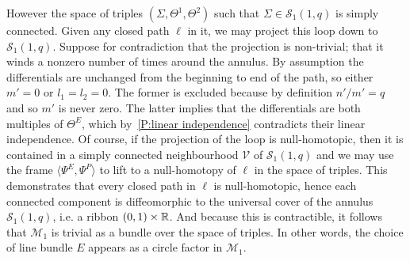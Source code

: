 \documentclass{article}
\begin{document}
However the space of triples $(\Sigma,\Theta^1,\Theta^2)$ such that $\Sigma \in \mathcal{S}_1(1,q)$ is simply connected. Given any closed path $\ell$ in it, we may project this loop down to $\mathcal{S}_1(1,q)$. 
Suppose for contradiction that the projection is non-trivial; that it winds a nonzero number of times around the annulus. By assumption the differentials are unchanged from the beginning to end of the path, so either $m' = 0$ or $l_1=l_2 = 0$. The former is excluded because by definition $n'/m' = q$ and so $m'$ is never zero. The latter implies that the differentials are both multiples of $\Theta^E$, which by~\ref{P:linear independence} contradicts their linear independence. 
Of course, if the projection of the loop is null-homotopic, then it is contained in a simply connected neighbourhood $\mathcal{V}$ of $\mathcal{S}_1(1,q)$ and we may use the frame $\langle \Psi^E,\Psi^P \rangle$ to lift to a null-homotopy of $\ell$ in the space of triples.
This demonstrates that every closed path in $\ell$ is null-homotopic, hence each connected component is diffeomorphic to the universal cover of the annulus $\mathcal{S}_1(1,q)$, i.e. a ribbon $(0,1)\times \mathbb{R}$. And because this is contractible, it follows that $\mathcal{M}_1$ is trivial as a bundle over the space of triples. In other words, the choice of line bundle $E$ appears as a circle factor in $\mathcal{M}_1$.
\end{document}
